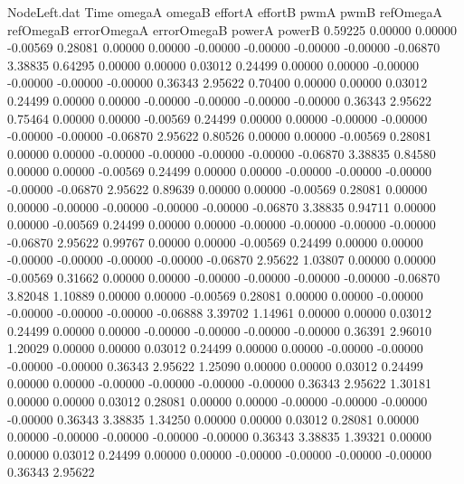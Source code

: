 \begin{filecontents}{NodeLeft.dat}
Time omegaA omegaB effortA effortB pwmA pwmB refOmegaA refOmegaB errorOmegaA errorOmegaB powerA powerB
   0.59225    0.00000    0.00000    -0.00569    0.28081    0.00000    0.00000   -0.00000   -0.00000   -0.00000   -0.00000   -0.06870    3.38835
   0.64295    0.00000    0.00000     0.03012    0.24499    0.00000    0.00000   -0.00000   -0.00000   -0.00000   -0.00000    0.36343    2.95622
   0.70400    0.00000    0.00000     0.03012    0.24499    0.00000    0.00000   -0.00000   -0.00000   -0.00000   -0.00000    0.36343    2.95622
   0.75464    0.00000    0.00000    -0.00569    0.24499    0.00000    0.00000   -0.00000   -0.00000   -0.00000   -0.00000   -0.06870    2.95622
   0.80526    0.00000    0.00000    -0.00569    0.28081    0.00000    0.00000   -0.00000   -0.00000   -0.00000   -0.00000   -0.06870    3.38835
   0.84580    0.00000    0.00000    -0.00569    0.24499    0.00000    0.00000   -0.00000   -0.00000   -0.00000   -0.00000   -0.06870    2.95622
   0.89639    0.00000    0.00000    -0.00569    0.28081    0.00000    0.00000   -0.00000   -0.00000   -0.00000   -0.00000   -0.06870    3.38835
   0.94711    0.00000    0.00000    -0.00569    0.24499    0.00000    0.00000   -0.00000   -0.00000   -0.00000   -0.00000   -0.06870    2.95622
   0.99767    0.00000    0.00000    -0.00569    0.24499    0.00000    0.00000   -0.00000   -0.00000   -0.00000   -0.00000   -0.06870    2.95622
   1.03807    0.00000    0.00000    -0.00569    0.31662    0.00000    0.00000   -0.00000   -0.00000   -0.00000   -0.00000   -0.06870    3.82048
   1.10889    0.00000    0.00000    -0.00569    0.28081    0.00000    0.00000   -0.00000   -0.00000   -0.00000   -0.00000   -0.06888    3.39702
   1.14961    0.00000    0.00000     0.03012    0.24499    0.00000    0.00000   -0.00000   -0.00000   -0.00000   -0.00000    0.36391    2.96010
   1.20029    0.00000    0.00000     0.03012    0.24499    0.00000    0.00000   -0.00000   -0.00000   -0.00000   -0.00000    0.36343    2.95622
   1.25090    0.00000    0.00000     0.03012    0.24499    0.00000    0.00000   -0.00000   -0.00000   -0.00000   -0.00000    0.36343    2.95622
   1.30181    0.00000    0.00000     0.03012    0.28081    0.00000    0.00000   -0.00000   -0.00000   -0.00000   -0.00000    0.36343    3.38835
   1.34250    0.00000    0.00000     0.03012    0.28081    0.00000    0.00000   -0.00000   -0.00000   -0.00000   -0.00000    0.36343    3.38835
   1.39321    0.00000    0.00000     0.03012    0.24499    0.00000    0.00000   -0.00000   -0.00000   -0.00000   -0.00000    0.36343    2.95622

\end{filecontents}
